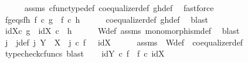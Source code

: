 \begin{isabellebody}
\ \ \ \ \isamarkupfalse%
\ assms{\isacharparenleft}{\kern0pt}{}{\isacharparenright}{\kern0pt}\ cfunc{\isacharunderscore}{\kern0pt}type{\isacharunderscore}{\kern0pt}def\ coequalizer{\isacharunderscore}{\kern0pt}def\ gh{\isacharunderscore}{\kern0pt}def\ \isamarkupfalse%
\ fastforce\isanewline
\ \ \isamarkupfalse%
\ fg{\isacharunderscore}{\kern0pt}eqs{\isacharunderscore}{\kern0pt}fh{\isacharcolon}{\kern0pt}\ {\isachardoublequoteopen}f\ {\isasymcirc}\isactrlsub c\ g\ {\isacharequal}{\kern0pt}\ f\ {\isasymcirc}\isactrlsub c\ h{\isachardoublequoteclose}\isanewline
\ \ \ \ \isamarkupfalse%
\ coequalizer{\isacharunderscore}{\kern0pt}def\ gh{\isacharunderscore}{\kern0pt}def\ \isamarkupfalse%
\ blast\ \ \ \ \isanewline
\ \ \isamarkupfalse%
\ \isamarkupfalse%
\ {\isachardoublequoteopen}id{\isacharparenleft}{\kern0pt}X{\isacharparenright}{\kern0pt}{\isasymcirc}\isactrlsub c\ g\ {\isacharequal}{\kern0pt}\ id{\isacharparenleft}{\kern0pt}X{\isacharparenright}{\kern0pt}\ {\isasymcirc}\isactrlsub c\ \ h{\isachardoublequoteclose}\isanewline
\ \ \ \ \isamarkupfalse%
\ W{\isacharunderscore}{\kern0pt}def\ assms{\isacharparenleft}{\kern0pt}{}{\isacharcomma}{\kern0pt}{}{\isacharparenright}{\kern0pt}\ monomorphism{\isacharunderscore}{\kern0pt}def{}\ \isamarkupfalse%
\ blast\ \ \ \ \ \isanewline
\ \ \isamarkupfalse%
\ \isamarkupfalse%
\ j\ \ j{\isacharunderscore}{\kern0pt}def{\isacharcolon}{\kern0pt}\ {\isachardoublequoteopen}j{\isacharcolon}{\kern0pt}\ Y\ {\isasymrightarrow}\ X\ {\isasymand}\ j\ {\isasymcirc}\isactrlsub c\ f\ {\isacharequal}{\kern0pt}\ \ id{\isacharparenleft}{\kern0pt}X{\isacharparenright}{\kern0pt}{\isachardoublequoteclose}\isanewline
\ \ \ \ \isamarkupfalse%
\ assms{\isacharparenleft}{\kern0pt}{}{\isacharparenright}{\kern0pt}\ \ W{\isacharunderscore}{\kern0pt}def\ \ coequalizer{\isacharunderscore}{\kern0pt}def{}\ \isamarkupfalse%
\ {\isacharparenleft}{\kern0pt}typecheck{\isacharunderscore}{\kern0pt}cfuncs{\isacharcomma}{\kern0pt}\ blast{\isacharparenright}{\kern0pt}\isanewline
\ \ \isamarkupfalse%
\ {\isachardoublequoteopen}id{\isacharparenleft}{\kern0pt}Y{\isacharparenright}{\kern0pt}\ {\isasymcirc}\isactrlsub c\ f\ {\isacharequal}{\kern0pt}\ f\ {\isasymcirc}\isactrlsub c\ id{\isacharparenleft}{\kern0pt}X{\isacharparenright}{\kern0pt}{\isachardoublequoteclose}\isanewline

\end{isabellebody}
